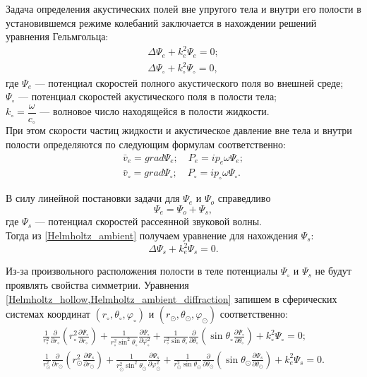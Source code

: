 Задача определения акустических полей вне упругого тела и внутри его полости в установившемся режиме колебаний заключается в нахождении решений уравнения Гельмгольца:
\begin{align}
\Delta\Psi_e + k_e^2\Psi_e = 0;\label{Helmholtz_ambient}\\
\Delta\Psi_\circ + k_\circ^2\Psi_\circ = 0,\label{Helmholtz_hollow}
\end{align}
где $\Psi_e$ --- потенциал скоростей полного акустического поля во внешней среде;\\
$\Psi_\circ$ --- потенциал скоростей акустического поля в полости тела;\\
$k_\circ = \dfrac{\omega}{c_\circ}$ --- волновое число находящейся в полости жидкости.\\ При этом скорости частиц жидкости и акустическое давление вне тела и внутри полости определяются по следующим формулам соответственно:
\begin{align}
\bar{v}_e =  grad\Psi_e; \quad P_e = ip_e\omega\Psi_e;\label{eq_ven}\\
\bar{v}_\circ =  grad\Psi_\circ; \quad P_\circ = ip_\circ\omega\Psi_\circ.\label{eq_vc}
\end{align}


В силу линейной постановки задачи для $\Psi_e$ и $\Psi_o$ справедливо
\begin{equation} \label{potention_speed_ambient}
\Psi_e = \Psi_o + \Psi_s,
\end{equation}
где $\Psi_s$ --- потенциал скоростей рассеянной звуковой волны.\\
Тогда из \eqref{Helmholtz_ambient} получаем уравнение для нахождения $\Psi_s$:
\begin{equation} \label{Helmholtz_ambient_diffraction}
\Delta\Psi_s + k_e^2\Psi_s = 0.
\end{equation}

Из-за произвольного расположения полости в теле потенциалы $\Psi_\circ$ и $\Psi_s$ не будут проявлять свойства симметрии.
Уравнения \cref{Helmholtz_hollow,Helmholtz_ambient_diffraction} запишем в сферических системах координат $(r_\circ, \theta_\circ, \varphi_\circ)$ и $(r_\odot, \theta_\odot, \varphi_\odot)$ соответственно:
\begin{align}
\frac1{r_\circ^2}\frac\partial{\partial r_\circ}\left(r_\circ^2 \frac{\partial\Psi_\circ}{\partial r_\circ}\right) + \frac1{r_\circ^2\sin^2\theta_\circ}\frac{\partial\Psi_\circ}{\partial\varphi_\circ^2} + \frac1{r_\circ^2\sin\theta_\circ}\frac\partial{\partial\theta_\circ} \left(\sin\theta_\circ \frac{\partial\Psi_\circ}{\partial\theta_\circ}\right) + k_\circ^2\Psi_\circ = 0;\\
\frac1{r_\odot^2}\frac\partial{\partial r_\odot}\left(r_\odot^2 \frac{\partial\Psi_s}{\partial r_\odot}\right) + \frac1{r_\odot^2\sin^2\theta_\odot}\frac{\partial\Psi_s}{\partial\varphi_\odot^2} + \frac1{r_\odot^2\sin\theta_\odot}\frac\partial{\partial\theta_\odot} \left(\sin\theta_\odot \frac{\partial\Psi_s}{\partial\theta_\odot}\right) + k_e^2\Psi_s = 0.
\end{align}


